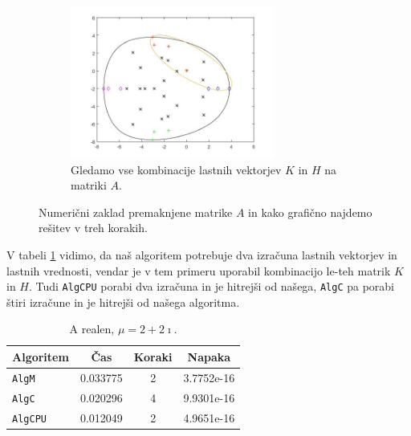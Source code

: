 \documentclass[12pt,a4paper]{amsart}
\theoremstyle{definition}
\theoremstyle{plain}
\begin{document}
\begin{figure}[H]
\begin{subfigure}[t]{0.45\textwidth}
\label{fig:p53}
\end{subfigure}%
\hfill
\begin{subfigure}[t]{0.45\textwidth}
\includegraphics[width=0.9\linewidth,height=5cm]{RC3e3.jpg}
\caption{Gledamo vse kombinacije lastnih vektorjev $K$ in $H$ na matriki $A$.\footnotemark[\value{footnote}]}
\label{fig:p53}
\end{subfigure}
\caption{Numerični zaklad premaknjene matrike $A$ in kako grafično najdemo rešitev v treh korakih.}
\end{figure}
V tabeli \ref{t5} vidimo, da naš algoritem potrebuje dva izračuna lastnih vektorjev in lastnih vrednosti, vendar je v tem primeru uporabil kombinacijo le-teh matrik $K$ in $H$. Tudi \verb+AlgCPU+ porabi dva izračuna in je hitrejši od našega, \verb+AlgC+ pa porabi štiri izračune in je hitrejši od našega algoritma.
\begin{table}[H]
\caption{A realen, $\mu = 2 + 2\imath$.}
\begin{tabular}{|l|c|c|c|}
\hline
Algoritem & Čas & Koraki & Napaka\\
\hline
\hline
\verb+AlgM+ &0.033775&2&3.7752e-16\\
\hline
\verb+AlgC+ &0.020296 &4 & 9.9301e-16\\
\hline
\verb+AlgCPU+ &0.012049&2&4.9651e-16 \\
\hline
\end{tabular}

\label{t5}
\end{table}
\end{document}
